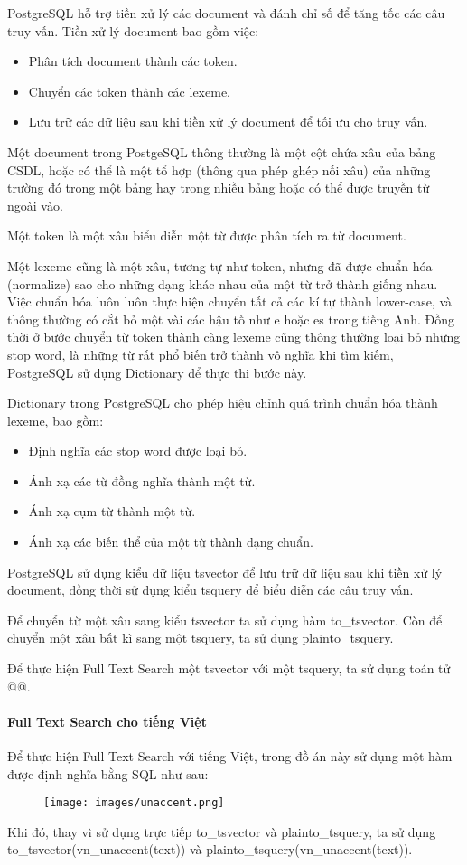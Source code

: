 PostgreSQL hỗ trợ tiền xử lý các document và đánh chỉ
số để tăng tốc các câu truy vấn. Tiền xử lý document bao gồm việc:
\begin{itemize}[topsep=0ex]
\item Phân tích document thành các token.
\item Chuyển các token thành các lexeme.
\item Lưu trữ các dữ liệu sau khi tiền xử lý
    document để tối ưu cho truy vấn.
\end{itemize}

Một document trong PostgeSQL thông thường là một cột chứa
xâu của bảng CSDL, hoặc có thể là một 
tổ hợp (thông qua phép ghép nối xâu) của những trường
đó trong một bảng hay trong nhiều bảng hoặc
có thể được truyền từ ngoài vào. 

Một token là một xâu biểu diễn một từ được phân tích ra từ document.

Một lexeme cũng là một xâu, tương tự như token, nhưng đã
được chuẩn hóa (normalize) sao cho những dạng khác nhau của
một từ trở thành giống nhau. Việc chuẩn hóa luôn luôn
thực hiện chuyển tất cả các kí tự thành lower-case, và thông
thường có cắt bỏ một vài các hậu tố như e hoặc es trong tiếng
Anh. Đồng thời ở bước chuyển từ token thành càng lexeme cũng
thông thường loại bỏ những stop word, là những từ rất phổ biến
trở thành vô nghĩa khi tìm kiếm, PostgreSQL sử dụng Dictionary
để thực thi bước này.

Dictionary trong PostgreSQL cho phép hiệu chỉnh quá trình
chuẩn hóa thành lexeme, bao gồm:
\begin{itemize}[topsep=0ex]
\item Định nghĩa các stop word được loại bỏ.
\item Ánh xạ các từ đồng nghĩa thành một từ.
\item Ánh xạ cụm từ thành một từ.
\item Ánh xạ các biến thể của một từ thành dạng chuẩn.
\end{itemize}

PostgreSQL sử dụng kiểu dữ liệu tsvector để lưu trữ dữ
liệu sau khi tiền xử lý document, đồng thời sử dụng kiểu
tsquery để biểu diễn các câu truy vấn.

Để chuyển từ một xâu sang kiểu tsvector ta sử dụng hàm
to\_tsvector. Còn để chuyển một xâu bất kì sang một tsquery,
ta sử dụng plainto\_tsquery. 

Để thực hiện Full Text Search một tsvector với một tsquery,
ta sử dụng toán tử @@.

\paragraph{Full Text Search cho tiếng Việt}
Để thực hiện Full Text Search với tiếng Việt,
trong đồ án này sử dụng một hàm được định nghĩa bằng SQL như sau: 
\begin{figure}[H]
\centering
\texttt{[image: images/unaccent.png]}
\end{figure}
Khi đó, thay vì sử dụng trực tiếp to\_tsvector và plainto\_tsquery,
ta sử dụng \\
to\_tsvector(vn\_unaccent(text)) và plainto\_tsquery(vn\_unaccent(text)).

